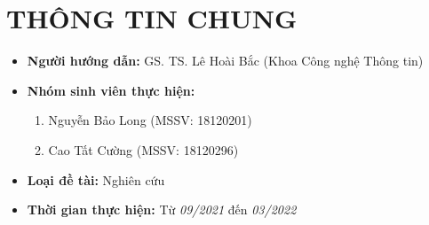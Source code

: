 \documentclass{article}[14pt]
\begin{document}
    \section{THÔNG TIN CHUNG}
    \begin{itemize}[label = {}]
        \item \textbf{Người hướng dẫn:} GS. TS. Lê Hoài Bắc (Khoa Công nghệ Thông tin)

        \item \textbf{Nhóm sinh viên thực hiện:}
        \begin{enumerate}
            \item Nguyễn Bảo Long (MSSV: 18120201) 
            \item Cao Tất Cường (MSSV: 18120296)
        \end{enumerate}

        \item \textbf{Loại đề tài:} Nghiên cứu
        \item \textbf{Thời gian thực hiện:} Từ \textit{09/2021} đến \textit{03/2022}
    \end{itemize}
\end{document}
